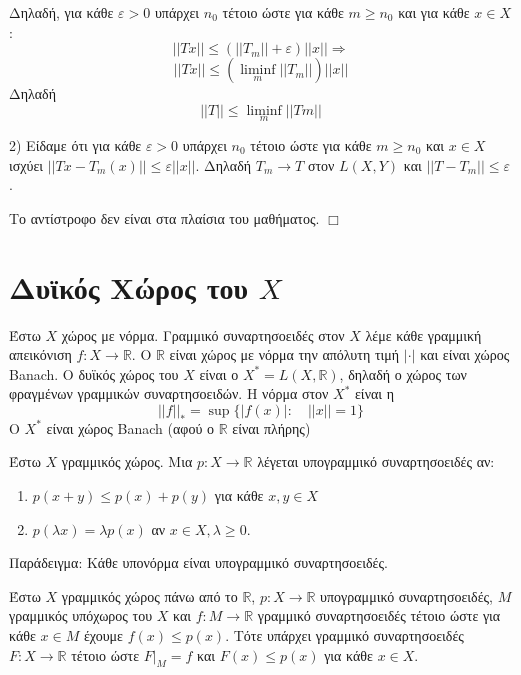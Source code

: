     
    Δηλαδή, για κάθε $\varepsilon >0$ υπάρχει $n_0$ τέτοιο ώστε για κάθε $m\geq n_0$ και για κάθε $x \in X$:
    $$||Tx|| \leq \left( ||T_m|| + \varepsilon\right)||x|| \Rightarrow$$
    $$||Tx|| \leq (\liminf_m ||T_m||) ||x||$$ Δηλαδή
    $$||T|| \leq \liminf_m ||Tm||$$


    2) Είδαμε ότι για κάθε $\varepsilon >0$ υπάρχει $n_0$ τέτοιο ώστε για κάθε $m\geq n_0$ και $x \in X$ ισχύει $||Tx-T_m(x) || \leq \varepsilon ||x||$. Δηλαδή $T_m \rightarrow T$ στον $L(X,Y)$ και $||T-T_m|| \leq \varepsilon$.

    
    Το αντίστροφο δεν είναι στα πλαίσια του μαθήματος. %
\hfill $\Box$

\pagebreak

\section{Δυϊκός Χώρος του $X$}


Έστω $X$ χώρος με νόρμα. Γραμμικό συναρτησοειδές στον $X$ λέμε κάθε γραμμική απεικόνιση $f: X \rightarrow \mathbb R$. Ο $\mathbb{R}$ είναι χώρος με νόρμα την απόλυτη τιμή $|\cdot |$ και είναι χώρος  Banach. Ο δυϊκός χώρος του $X$ είναι ο $X^* = L(X,\mathbb R)$, δηλαδή ο χώρος των φραγμένων γραμμικών συναρτησοειδών. Η νόρμα στον $X^*$ είναι η 
$$||f||_* = \sup \{ |f(x)|: \quad ||x|| = 1\}$$ Ο $X^*$ είναι χώρος Banach (αφού ο $\mathbb R$ είναι πλήρης)

\begin{definition}
    Έστω $X$ γραμμικός χώρος. Μια $p : X \rightarrow \mathbb R$ λέγεται υπογραμμικό συναρτησοειδές αν:
    \begin{enumerate}
        \item $p(x+y) \leq p(x) + p(y)$ για κάθε $x,y \in X$
        \item $p(\lambda x) = \lambda p(x)$ αν $x \in X, \lambda \geq 0$.
    \end{enumerate}
\end{definition}


Παράδειγμα: Κάθε υπονόρμα είναι υπογραμμικό συναρτησοειδές.

\begin{theorem}
    Έστω $X$ γραμμικός χώρος πάνω από το $\mathbb R$, $p: X \rightarrow \mathbb R$ υπογραμμικό συναρτησοειδές, $M$ γραμμικός υπόχωρος του $X$ και $f: M \rightarrow \mathbb R$ γραμμικό συναρτησοειδές τέτοιο ώστε για κάθε $x \in M$ έχουμε $f(x) \leq p(x)$. Τότε υπάρχει γραμμικό συναρτησοειδές $F:X \rightarrow \mathbb R$ τέτοιο ώστε $F|_M = f$ και $F(x) \leq p(x)$ για κάθε $x \in X$.
\end{theorem}


